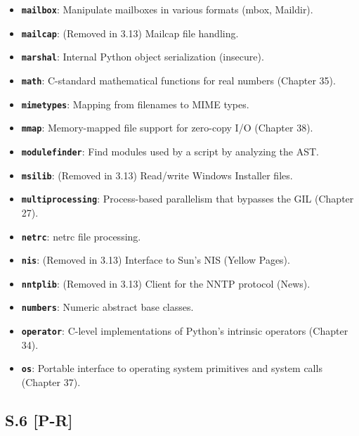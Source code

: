 \begin{itemize}
\tightlist
\item
  \textbf{\passthrough{\lstinline!mailbox!}}: Manipulate mailboxes in
  various formats (mbox, Maildir).
\item
  \textbf{\passthrough{\lstinline!mailcap!}}: (Removed in 3.13) Mailcap
  file handling.
\item
  \textbf{\passthrough{\lstinline!marshal!}}: Internal Python object
  serialization (insecure).
\item
  \textbf{\passthrough{\lstinline!math!}}: C-standard mathematical
  functions for real numbers (Chapter 35).
\item
  \textbf{\passthrough{\lstinline!mimetypes!}}: Mapping from filenames
  to MIME types.
\item
  \textbf{\passthrough{\lstinline!mmap!}}: Memory-mapped file support
  for zero-copy I/O (Chapter 38).
\item
  \textbf{\passthrough{\lstinline!modulefinder!}}: Find modules used by
  a script by analyzing the AST.
\item
  \textbf{\passthrough{\lstinline!msilib!}}: (Removed in 3.13)
  Read/write Windows Installer files.
\item
  \textbf{\passthrough{\lstinline!multiprocessing!}}: Process-based
  parallelism that bypasses the GIL (Chapter 27).
\item
  \textbf{\passthrough{\lstinline!netrc!}}: netrc file processing.
\item
  \textbf{\passthrough{\lstinline!nis!}}: (Removed in 3.13) Interface to
  Sun's NIS (Yellow Pages).
\item
  \textbf{\passthrough{\lstinline!nntplib!}}: (Removed in 3.13) Client
  for the NNTP protocol (News).
\item
  \textbf{\passthrough{\lstinline!numbers!}}: Numeric abstract base
  classes.
\item
  \textbf{\passthrough{\lstinline!operator!}}: C-level implementations
  of Python's intrinsic operators (Chapter 34).
\item
  \textbf{\passthrough{\lstinline!os!}}: Portable interface to operating
  system primitives and system calls (Chapter 37).
\end{itemize}

\hypertarget{s.6-p-r}{%
\subsection{S.6 {[}P-R{]}}\label{s.6-p-r}}

